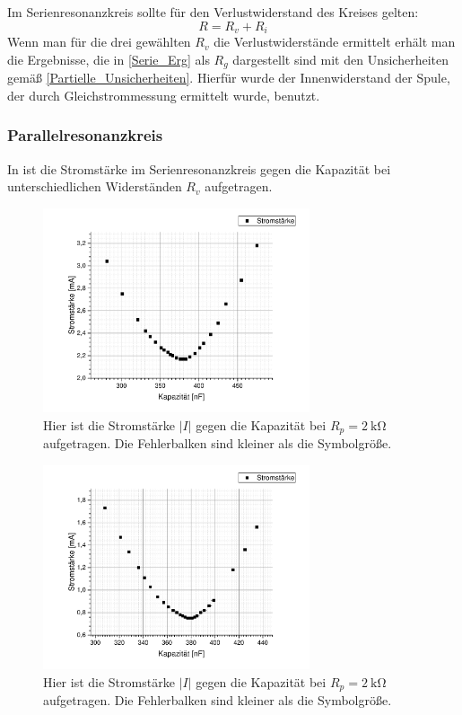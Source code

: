 \documentclass[
	a4paper,
	12pt,
	pagesize,
	ngerman
]{scrartcl}
\begin{document}
	Im Serienresonanzkreis sollte für den Verlustwiderstand des Kreises gelten:
	\begin{equation}
		R=R_v+R_i
		\label{Verlust}
	\end{equation}
	Wenn man für die drei gewählten $R_v$ die Verlustwiderstände ermittelt erhält man die Ergebnisse, die in \cref{Serie_Erg} als $R_g$ dargestellt sind mit den Unsicherheiten gemäß \cref{Partielle_Unsicherheiten}.
	Hierfür wurde der Innenwiderstand der Spule, der durch Gleichstrommessung ermittelt wurde, benutzt.
	\subsubsection{Parallelresonanzkreis}
	
	In  ist die Stromstärke im Serienresonanzkreis gegen die Kapazität bei unterschiedlichen Widerständen $ R_v $ aufgetragen.
	\begin{figure}[H]
		\includegraphics[width=0.7\textwidth]{Parallelstromkreis_2k}
		\centering
		\caption{Hier ist die Stromstärke $ \left| I \right| $ gegen die Kapazität bei $ R_p = \SI{2}{\kilo \ohm} $ aufgetragen. Die Fehlerbalken sind kleiner als die Symbolgröße.}
		\label{Para_2k}
		\centering
	\end{figure} 
	\begin{figure}[H]
		\includegraphics[width=0.7\textwidth]{Parallelstromkreis_10k}
		\centering
		\caption{Hier ist die Stromstärke $ \left| I \right| $ gegen die Kapazität bei $ R_p = \SI{2}{\kilo \ohm} $ aufgetragen. Die Fehlerbalken sind kleiner als die Symbolgröße.}
		\label{Para_10k}
		\centering
	\end{figure} 
\end{document}
